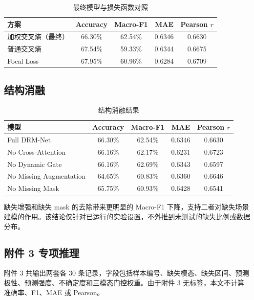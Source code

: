 \begin{table}[htbp]
\centering
\caption{最终模型与损失函数对照}
\begin{tabular}{lcccc}
\hline
方案 & Accuracy & Macro-F1 & MAE & Pearson $r$ \\ \hline
加权交叉熵（最终） & 66.30\% & 62.54\% & 0.6346 & 0.6630 \\ 
普通交叉熵 & 67.54\% & 59.33\% & 0.6344 & 0.6675 \\ 
Focal Loss & 67.95\% & 60.96\% & 0.6284 & 0.6709 \\ \hline
\end{tabular}
\end{table}

\subsection{结构消融}
\begin{table}[htbp]
\centering
\caption{结构消融结果}
\begin{tabular}{lcccc}
\hline
模型 & Accuracy & Macro-F1 & MAE & Pearson $r$ \\ \hline
Full DRM-Net & 66.30\% & 62.54\% & 0.6346 & 0.6630 \\ 
No Cross-Attention & 66.16\% & 62.17\% & 0.6231 & 0.6723 \\ 
No Dynamic Gate & 66.16\% & 62.69\% & 0.6343 & 0.6597 \\ 
No Missing Augmentation & 64.65\% & 60.83\% & 0.6360 & 0.6646 \\ 
No Missing Mask & 65.75\% & 60.93\% & 0.6428 & 0.6541 \\ \hline
\end{tabular}
\end{table}

缺失增强和缺失 mask 的去除带来更明显的 Macro-F1 下降，支持二者对缺失场景建模的作用。该结论仅针对已运行的实验设置，不外推到未测试的缺失比例或数据分布。

\subsection{附件 3 专项推理}
附件 3 共输出两套各 30 条记录，字段包括样本编号、缺失模态、缺失区间、预测极性、预测强度、不确定度和三模态门控权重。由于附件 3 无标签，本文不计算准确率、F1、MAE 或 Pearson。

